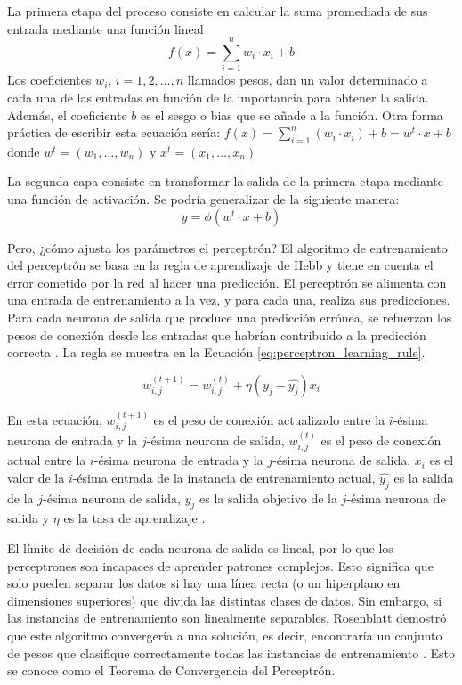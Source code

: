 La primera etapa del proceso consiste en calcular la suma promediada de sus entrada mediante una función lineal
\begin{equation}
f(x) = \sum_{i=1}^{n} w_i \cdot x_i + b
\end{equation}
Los coeficientes $w_i$, $i=1,2, \ldots, n$ llamados pesos, dan un valor determinado a cada una de las entradas en función de la importancia para obtener la salida. Además, el coeficiente $b$ es el sesgo o bias que se añade a la función. Otra forma práctica de escribir esta ecuación sería: $f(x) = \sum_{i=1}^{n} (w_i \cdot x_i) + b= w^t \cdot x + b$  donde $w^t = (w_1, \ldots, w_n)$ y $x^t = (x_1, \ldots, x_n)$

La segunda capa consiste en transformar la salida de la primera etapa mediante una función de activación. Se podría generalizar de la siguiente manera:
\begin{equation}
y = \phi(w^t \cdot x + b)
\end{equation}

Pero, ¿cómo ajusta los parámetros el perceptrón? El algoritmo de entrenamiento del perceptrón se basa en la regla de aprendizaje de Hebb y tiene en cuenta el error cometido por la red al hacer una predicción. El perceptrón se alimenta con una entrada de entrenamiento a la vez, y para cada una, realiza sus predicciones. Para cada neurona de salida que produce una predicción errónea, se refuerzan los pesos de conexión desde las entradas que habrían contribuido a la predicción correcta \citep{geron2022hands}. La regla se muestra en la Ecuación \ref{eq:perceptron_learning_rule}.

\begin{equation}
w_{i,j}^{(t+1)} = w_{i,j}^{(t)} + \eta (y_j - \hat{y_j}) x_i
\label{eq:perceptron_learning_rule}
\end{equation}

En esta ecuación, $w_{i,j}^{(t+1)}$ es el peso de conexión actualizado entre la $i$-ésima neurona de entrada y la $j$-ésima neurona de salida, $w_{i,j}^{(t)}$ es el peso de conexión actual entre la $i$-ésima neurona de entrada y la $j$-ésima neurona de salida, $x_i$ es el valor de la $i$-ésima entrada de la instancia de entrenamiento actual, $\hat{y_j}$ es la salida de la $j$-ésima neurona de salida, $y_j$ es la salida objetivo de la $j$-ésima neurona de salida y $\eta$ es la tasa de aprendizaje \citep{geron2022hands}.


El límite de decisión de cada neurona de salida es lineal, por lo que los perceptrones son incapaces de aprender patrones complejos. Esto significa que solo pueden separar los datos si hay una línea recta (o un hiperplano en dimensiones superiores) que divida las distintas clases de datos. Sin embargo, si las instancias de entrenamiento son linealmente separables, Rosenblatt demostró que este algoritmo convergería a una solución, es decir, encontraría un conjunto de pesos que clasifique correctamente todas las instancias de entrenamiento \citep{geron2022hands}. Esto se conoce como el Teorema de Convergencia del Perceptrón.



